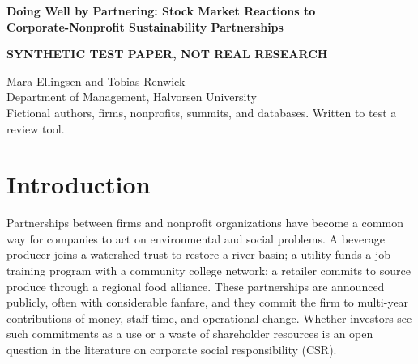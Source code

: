 \documentclass[11pt]{article}
\begin{document}
\begin{center}
{\Large\bfseries Doing Well by Partnering: Stock Market Reactions to\\ Corporate-Nonprofit Sustainability Partnerships\par}
\vspace{0.8em}
{\large\bfseries SYNTHETIC TEST PAPER, NOT REAL RESEARCH\par}
\vspace{0.8em}
Mara Ellingsen and Tobias Renwick\\
Department of Management, Halvorsen University\\
\vspace{0.4em}
{\small Fictional authors, firms, nonprofits, summits, and databases. Written to test a review tool.}
\end{center}

\begin{abstract}
\noindent Firms increasingly announce partnerships with nonprofit organizations to address environmental and social problems. We ask whether investors reward these commitments. Using 212 announcements of corporate-nonprofit sustainability partnerships by U.S.-listed firms between 2007 and 2012, we find positive and significant cumulative abnormal returns around the announcement. The reaction is larger for firms with a stronger prior reputation for corporate social responsibility, and announcements with high-visibility nonprofit partners earn positive abnormal returns of their own. The results suggest that sustainability partnerships create value for shareholders and that investors price the credibility a firm has built through its past conduct.
\end{abstract}

\section{Introduction}

Partnerships between firms and nonprofit organizations have become a common way for companies to act on environmental and social problems. A beverage producer joins a watershed trust to restore a river basin; a utility funds a job-training program with a community college network; a retailer commits to source produce through a regional food alliance. These partnerships are announced publicly, often with considerable fanfare, and they commit the firm to multi-year contributions of money, staff time, and operational change. Whether investors see such commitments as a use or a waste of shareholder resources is an open question in the literature on corporate social responsibility (CSR).
\end{document}

